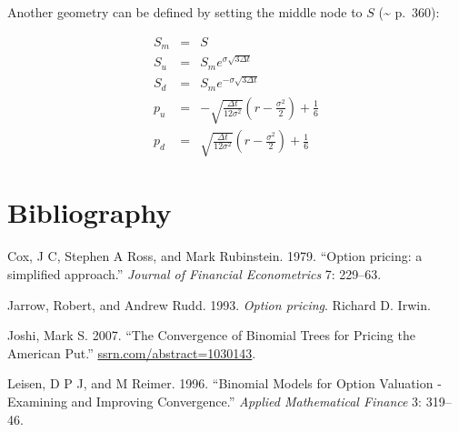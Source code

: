 \documentclass[justified]{tufte-book}
\newlength{\cslhangindent}
\newenvironment{cslreferences}%
  {\setlength{\parindent}{0pt}%
  \everypar{\setlength{\hangindent}{\cslhangindent}}\ignorespaces}%
  {\par}
\begin{document}
Another geometry can be defined by setting the middle node to
\(S\) (\textasciitilde{}\cite{Hull1997} p.~360):

\begin{eqnarray*}
    S_m &=& S  \\
    S_u &=& S_m e^{\sigma \sqrt{3 \Delta t}} \\
    S_d &=& S_m e^{-\sigma \sqrt{3 \Delta t}} \\
    p_u &=& -\sqrt{\frac{\Delta t}{12 \sigma^2}} \left(r-\frac{\sigma^2}{2} \right) + \frac{1}{6} \\
    p_d &=&  \sqrt{\frac{\Delta t}{12 \sigma^2}} \left(r-\frac{\sigma^2}{2} \right) + \frac{1}{6}
\end{eqnarray*}

\hypertarget{bibliography}{%
\chapter{Bibliography}\label{bibliography}}

\hypertarget{refs}{}
\begin{cslreferences}
\leavevmode\hypertarget{ref-JohnC.Cox1979}{}%
Cox, J C, Stephen A Ross, and Mark Rubinstein. 1979. ``Option pricing: a simplified approach.'' \emph{Journal of Financial Econometrics} 7: 229--63.

\leavevmode\hypertarget{ref-R.Jarrow1993}{}%
Jarrow, Robert, and Andrew Rudd. 1993. \emph{Option pricing}. Richard D. Irwin.

\leavevmode\hypertarget{ref-Joshi2007}{}%
Joshi, Mark S. 2007. ``The Convergence of Binomial Trees for Pricing the American Put.'' \url{ssrn.com/abstract=1030143}.

\leavevmode\hypertarget{ref-Leisen1996}{}%
Leisen, D P J, and M Reimer. 1996. ``Binomial Models for Option Valuation - Examining and Improving Convergence.'' \emph{Applied Mathematical Finance} 3: 319--46.
\end{cslreferences}


\printindex
\end{document}
